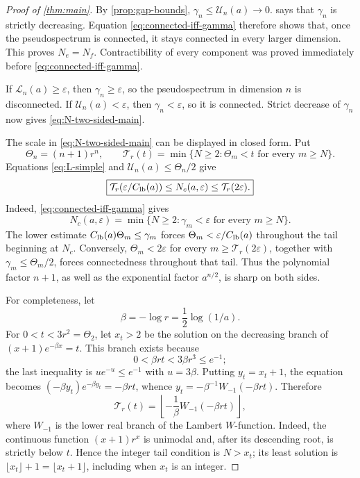 \documentclass[review,hidelinks,onefignum,onetabnum]{siamart251216}
\begin{document}
\begin{proof}[Proof of \cref{thm:main}]
By \cref{prop:gap-bounds},
\(\gamma_n\leq\mathcal U_n(a)\to0\).   says that
\(\gamma_n\) is strictly decreasing.  Equation
\eqref{eq:connected-iff-gamma} therefore shows that, once the
pseudospectrum is connected, it stays connected in every larger
dimension.  This proves \(N_e=N_f\).  Contractibility of every component
was proved immediately before \eqref{eq:connected-iff-gamma}.

If \(\mathcal L_n(a)\geq\varepsilon\), then
\(\gamma_n\geq\varepsilon\), so the pseudospectrum in dimension \(n\)
is disconnected.  If \(\mathcal U_n(a)<\varepsilon\), then
\(\gamma_n<\varepsilon\), so it is connected.  Strict decrease of
\(\gamma_n\) now gives \eqref{eq:N-two-sided-main}.

The scale in \eqref{eq:N-two-sided-main} can be displayed in closed form.
Put
\[
 \Theta_n=(n+1)r^n,\qquad
 \mathcal T_r(t)=\min\{N\geq2:\Theta_m<t\text{ for every }m\geq N\}.
\]
Equations \eqref{eq:L-simple} and
\(\mathcal U_n(a)\leq\Theta_n/2\) give
\begin{equation}\label{eq:tail-threshold-bounds}
 \boxed{
 \mathcal T_r(\varepsilon/C_{\rm lb}(a))\leq N_c(a,\varepsilon)
 \leq\mathcal T_r(2\varepsilon).}
\end{equation}
Indeed, \eqref{eq:connected-iff-gamma} gives
\[
 N_c(a,\varepsilon)=
 \min\{N\geq2:\gamma_m<\varepsilon\text{ for every }m\geq N\}.
\]
The lower estimate \(C_{\rm lb}(a)\Theta_m\leq\gamma_m\) forces
\(\Theta_m<\varepsilon/C_{\rm lb}(a)\) throughout the tail beginning
at \(N_c\).  Conversely, \(\Theta_m<2\varepsilon\) for every
\(m\geq\mathcal T_r(2\varepsilon)\), together with
\(\gamma_m\leq\Theta_m/2\), forces connectedness throughout that tail.
Thus the polynomial factor \(n+1\), as well as the exponential factor
\(a^{n/2}\), is sharp on both sides.

For completeness, let
\[
 \beta=-\log r=\frac12\log(1/a).
\]
For \(0<t<3r^2=\Theta_2\), let \(x_t>2\) be the solution on the decreasing
branch of \((x+1)e^{-\beta x}=t\).  This branch exists because
\[
 0<\beta rt<3\beta r^3\leq e^{-1};
\]
the last inequality is \(ue^{-u}\leq e^{-1}\) with \(u=3\beta\).
Putting \(y_t=x_t+1\), the equation becomes
\((-\beta y_t)e^{-\beta y_t}=-\beta rt\), whence
\(y_t=-\beta^{-1}W_{-1}(-\beta rt)\).  Therefore
\begin{equation}\label{eq:tail-threshold-Lambert}
 \mathcal T_r(t)=\left\lfloor
 -\frac1\beta W_{-1}(-\beta rt)\right\rfloor,
\end{equation}
where \(W_{-1}\) is the lower real branch of the Lambert \(W\)-function.
Indeed, the continuous function \((x+1)r^x\) is unimodal and, after its
descending root, is strictly below \(t\).  Hence the integer tail
condition is \(N>x_t\); its least solution is
\(\lfloor x_t\rfloor+1=\lfloor x_t+1\rfloor\), including when \(x_t\)
is an integer.


\end{proof}
\end{document}

